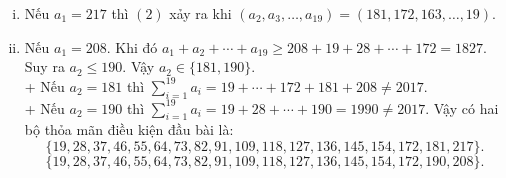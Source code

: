 \begin{bt}
{\begin{enumerate}[i)]
			\item Nếu $ a_1=217 $ thì $ (2) $ xảy ra khi $ (a_2,a_3,\ldots,a_{19})=(181,172,163, \ldots,19) $.
			\item Nếu $ a_1=208 $. Khi đó $ a_1+a_2+\cdots+a_{19} \ge 208+19+28+\cdots+172=1827$. Suy ra $ a_2 \le 190 $. Vậy $ a_2 \in \{181,190\} $.\\
			+ Nếu $ a_2=181 $ thì $ \sum\limits_{i=1}^{19} a_i=19+\cdots +172+181+208 \ne 2017 $. \\
			+ Nếu $ a_2=190 $ thì $ \sum\limits_{i=1}^{19} a_i=19+28+\cdots + 190=1990 \ne 2017 $.
			Vậy có hai bộ thỏa mãn điều kiện đầu bài là:
			$$ \{19,28,37,46,55,64,73,82,91,109,118,127,136,145,154,172,181,217 \} .$$
			$$ \{19,28,37,46,55,64,73,82,91,109,118,127,136,145,154,172,190,208 \} .$$
		\end{enumerate}
	}
\end{bt}





